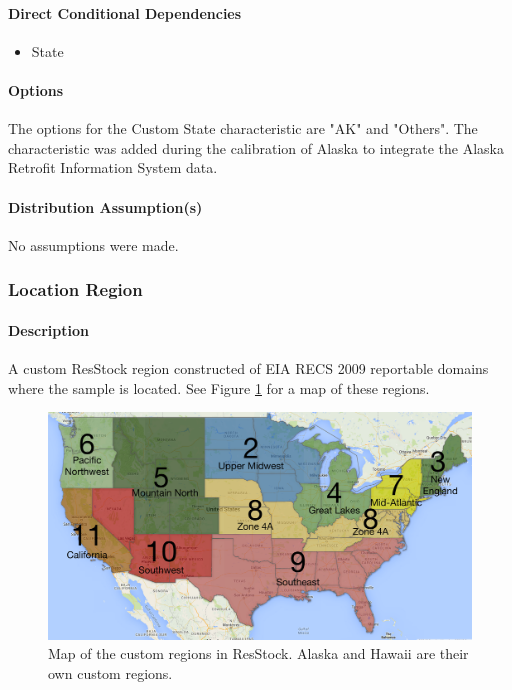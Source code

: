 \paragraph{Direct Conditional Dependencies}
\begin{itemize}
    \item State
\end{itemize}
\paragraph{Options}
The options for the Custom State characteristic are "AK" and "Others". The characteristic was added during the calibration of Alaska to integrate the Alaska Retrofit Information System data.

\paragraph{Distribution Assumption(s)}
No assumptions were made.

\subsubsection{Location Region}
\paragraph{Description}
A custom ResStock region constructed of EIA RECS 2009 reportable domains where the sample is located. See Figure \ref{fig:location_region_map} for a map of these regions.

\begin{figure}
    \centering
    \includegraphics[width=1\linewidth]{images/custom_region_map.png}
    \caption{ Map of the custom regions in ResStock. Alaska and Hawaii are their own custom regions.}
    \label{fig:location_region_map}
\end{figure}


